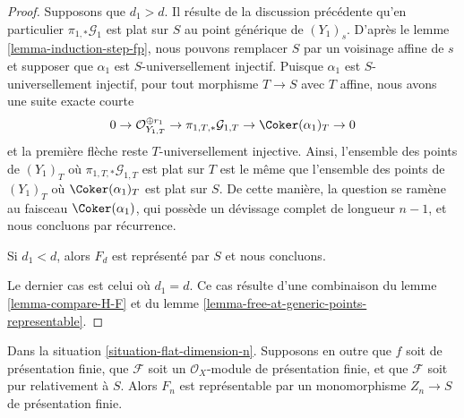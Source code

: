 \begin{proof}
\medskip\noindent
Supposons que $d_1 > d$. Il résulte de la discussion précédente qu'en
particulier $\pi_{1, *}\mathcal{G}_1$ est plat sur $S$ au
point générique de $(Y_1)_s$. D'après le
lemme \ref{lemma-induction-step-fp},
nous pouvons remplacer $S$ par un voisinage affine de $s$ et supposer que
$\alpha_1$ est $S$-universellement injectif. Puisque $\alpha_1$ est
$S$-universellement injectif, pour tout morphisme $T \to S$ avec $T$ affine,
nous avons une suite exacte courte
$$
0 \to \mathcal{O}_{Y_{1, T}}^{\oplus r_1}
\to \pi_{1, T, *}\mathcal{G}_{1, T} \to \Coker(\alpha_1)_T \to 0
$$
et la première flèche reste $T$-universellement injective. Ainsi, l'ensemble
des points de $(Y_1)_T$ où $\pi_{1, T, *}\mathcal{G}_{1, T}$ est plat sur
$T$ est le même que l'ensemble des points de $(Y_1)_T$ où
$\Coker(\alpha_1)_T$ est plat sur $S$. De cette manière, la question
se ramène au faisceau $\Coker(\alpha_1)$, qui possède un d\'evissage
complet de longueur $n - 1$, et nous concluons par récurrence.

\medskip\noindent
Si $d_1 < d$, alors $F_d$ est représenté par $S$ et nous concluons.

\medskip\noindent
Le dernier cas est celui où $d_1 = d$. Ce cas résulte d'une combinaison du
lemme \ref{lemma-compare-H-F}
et du
lemme \ref{lemma-free-at-generic-points-representable}.
\end{proof}

\begin{theorem}
\label{theorem-flat-dimension-n-representable}
Dans la situation \ref{situation-flat-dimension-n}.
Supposons en outre que $f$ soit de présentation finie, que
$\mathcal{F}$ soit un $\mathcal{O}_X$-module de présentation finie,
et que $\mathcal{F}$ soit pur relativement à $S$.
Alors $F_n$ est représentable par un monomorphisme
$Z_n \to S$ de présentation finie.
\end{theorem}


